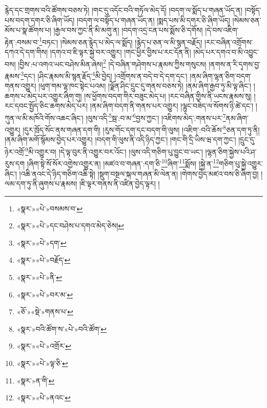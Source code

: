 རྙེད་དང་གྲགས་བའི་ཚོགས་བཅས་ཏེ། །གང་དུ་འདོང་བའི་གཏོལ་མེད་དོ། །བདག་ལ་སྨོད་པ་གཞན་ཡོད་ན། །བསྟོད་པས་བདག་དགར་ཅི་ཞིག་ཡོད། །བདག་ལ་བསྟོད་པ་གཞན་ཡོད་ན། །སྨད་པས་མི་དགར་ཅི་ཞིག་ཡོད། །སེམས་ཅན་མོས་པ་སྣ་ཚོགས་པ། །རྒྱལ་བས་ཀྱང་ནི་མི་མགུ་ན། །བདག་འདྲ་ངན་པས་སྨོས་ཅི་དགོས། །དེ་བས་འཇིག་རྟེན་:བསམ་བ་\footnote{«སྣར་»«པེ་»བསམས་བ་}བཏང་། །སེམས་ཅན་རྙེད་པ་མེད་ལ་སྨོད། །རྙེད་པ་ཅན་ལ་མི་སྙན་བརྗོད། །རང་བཞིན་འགྲོགས་དཀའ་དེ་དག་གིས། །དགའ་བ་ཇི་ལྟར་སྐྱེ་བར་འགྱུར། །གང་ཕྱིར་བྱིས་པ་རང་དོན་ནི། །མེད་པར་དགའ་བ་མི་འབྱུང་བས། །བྱིས་:པ་འགའ་ཡང་བཤེས་མིན་ཞེས།\footnote{«སྣར་»«པེ་»དང་བཤེས་པ་དགའ་མེད་ཅེས།} །དེ་བཞིན་གཤེགས་པ་རྣམས་ཀྱིས་གསུངས། །ནགས་ན་རི་དྭགས་བྱ་རྣམས་\footnote{«སྣར་»«པེ་»དག་}དང་། །ཤིང་རྣམས་མི་སྙན་རྗོད་\footnote{«སྣར་»«པེ་»བརྗོད་}མི་བྱེད། །འགྲོགས་ན་བདེ་བ་དེ་དག་དང་། །ནམ་ཞིག་ལྷན་ཅིག་བདག་གནས་འགྱུར། །ཕུག་གམ་ལྷ་ཁང་སྟེང་པའམ། །ལྗོན་ཤིང་དྲུང་དུ་གནས་བཅས་ཏེ། །ནམ་ཞིག་རྒྱབ་ཏུ་མི་ལྟ་ཞིང་། །ཆགས་པ་མེད་པར་འགྱུར་ཞིག་གུ། །ས་ཕྱོགས་བདག་གིར་བཟུང་མེད་པ། །རང་བཞིན་གྱིས་ནི་ཡངས་རྣམས་སུ། །རང་དབང་སྤྱོད་ཅིང་ཆགས་མེད་པར། །ནམ་ཞིག་བདག་ནི་གནས་པར་འགྱུར། །ལྷུང་བཟེད་ལ་སོགས་ཉི་ཚེ་དང་། །ཀུན་ལ་མི་མཁོའི་གོས་འཆང་ཞིང་། །ལུས་འདི་\footnote{«སྣར་»«པེ་»ནི་}སྦ་:བ་མ་\footnote{«སྣར་»«པེ་»བར་མ་}བྱས་ཀྱང་། །འཇིགས་མེད་:གནས་པར་\footnote{«ཅོ་»«སྡེ་»གནས་པ་}ནམ་ཞིག་འགྱུར། །དུར་ཁྲོད་སོང་ནས་གཞན་དག་གི། །རུས་གོང་དག་དང་བདག་གི་ལུས། །འཇིག་:བའི་ཆོས་\footnote{«སྣར་»བའི་ཚོག་ས་«པེ་»བའི་ཚོག་}ཅན་དག་ཏུ་ནི། །ནམ་ཞིག་མགོ་སྙོམས་བྱེད་པར་འགྱུར། །བདག་གི་ལུས་ནི་འདི་ཉིད་ཀྱང་། །གང་གི་དྲི་ཡིས་ཝ་དག་ཀྱང་། །དྲུང་དུ་ཉེར་འགྲོ་\footnote{«སྣར་»«པེ་»འགྲོར་}མི་འགྱུར་བ། །དེ་ལྟ་བུར་ནི་འགྱུར་བར་འོང་། །ལུས་འདི་གཅིག་པུ་བྱུང་བ་ཡང་། །ལྷན་ཅིག་སྐྱེས་པའི་ཤ་རུས་དག །ཞིག་སྟེ་སོ་སོར་འགྱེས་འགྱུར་ན། །མཛའ་བ་གཞན་:དག་ཅི་\footnote{«སྣར་»«པེ་»ལྟ་ཅི་}ཞིག་\footnote{«སྣར་»ན་གི་}སྨོས། །སྐྱེ་ན་\footnote{«སྣར་»«པེ་»ནའང་}གཅིག་པུ་སྐྱེ་འགྱུར་ཞིང་། །འཆི་ནའང་དེ་ཉིད་གཅིག་འཆི་སྟེ། །སྡུག་བསྔལ་སྐལ་གཞན་མི་ལེན་ན། །གེགས་བྱེད་མཛའ་བས་ཅི་ཞིག་བྱ། །ལམ་དག་ཏུ་ནི་ཞུགས་པ་རྣམས། །ཇི་ལྟར་གནས་ནི་འཛིན་བྱེད་ལྟར། །
